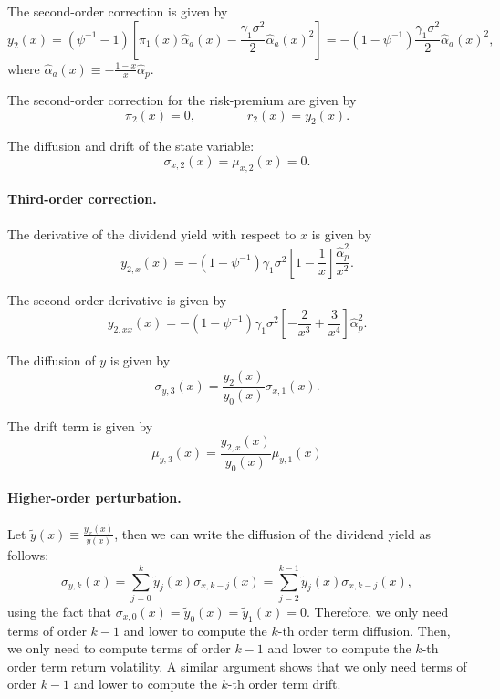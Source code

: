 \documentclass[11pt,english]{article}
\begin{document}
The second-order correction is given by
\begin{equation}
    y_{2}(x) = (\psi^{-1}-1) \left[ \pi_1(x) \hat{\alpha}_{a}(x) - \frac{\gamma_1 \sigma^2}{2} \hat{\alpha}_{a}(x)^2 \right] = -(1-\psi^{-1})\frac{\gamma_1\sigma^2 }{2} \hat{\alpha}_{a}(x)^2,
\end{equation}
where $\hat{\alpha}_{a}(x) \equiv -\frac{1-x}{x} \hat{\alpha}_{p}$.

The second-order correction for the risk-premium are given by
\begin{equation}
    \pi_2(x) = 0, \qquad \qquad
    r_2(x) = y_2(x).
\end{equation}

The diffusion and drift of the state variable:
\begin{equation}
    \sigma_{x,2}(x) = \mu_{x,2}(x) = 0.
\end{equation}

\paragraph{Third-order correction.} The derivative of the dividend yield with respect to $x$ is given by
\begin{equation}
    y_{2,x}(x) = -(1-\psi^{-1}) \gamma_1 \sigma^2 \left[ 1 -\frac{1}{x}\right] \frac{\hat{\alpha}_p^2}{x^2}.
\end{equation}

The second-order derivative is given by
\begin{equation}
    y_{2,xx}(x) = -(1-\psi^{-1}) \gamma_1 \sigma^2 \left[ -\frac{2}{x^3} +\frac{3}{x^4}\right] \hat{\alpha}_p^2.
\end{equation}

The diffusion of $y$ is given by 
\begin{equation}
    \sigma_{y,3}(x) = \frac{y_{2}(x)}{y_0(x)} \sigma_{x,1}(x).
\end{equation}

The drift term is given by
\begin{equation}
    \mu_{y,3}(x) = \frac{y_{2,x}(x)}{y_0(x)}\mu_{y,1}(x)
\end{equation}

\paragraph{Higher-order perturbation.} Let $\tilde{y}(x) \equiv \frac{y_x(x)}{y(x)}$, then we can write the diffusion of the dividend yield as follows:
\begin{equation}
    \sigma_{y,k}(x) = \sum_{j=0}^{k} \tilde{y}_{j}(x) \sigma_{x,k-j}(x) = \sum_{j=2}^{k-1} \tilde{y}_{j}(x) \sigma_{x,k-j}(x),
\end{equation}
using the fact that $\sigma_{x,0}(x) = \tilde{y}_{0}(x) = \tilde{y}_{1}(x) = 0$. 
Therefore, we only need terms of order $k-1$ and lower to compute the $k$-th order term diffusion.
Then, we only need to compute terms of order $k-1$ and lower to compute the $k$-th order term return volatility.
A similar argument shows that we only need terms of order $k-1$ and lower to compute the $k$-th order term drift.
\end{document}
